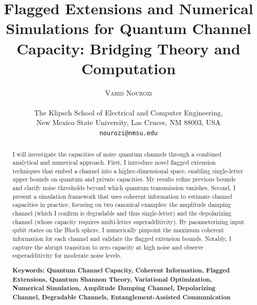 \documentclass[11pt]{article}
\theoremstyle{plain}
\theoremstyle{definition}
\numberwithin{equation}{section}
\begin{document}
\title{\textbf{Flagged Extensions and Numerical Simulations for Quantum Channel Capacity: Bridging
Theory and Computation}}


\author{
\textsc{Vahid Nourozi} \\
\vspace{-3ex}\\
\small The Klipsch School of Electrical and Computer Engineering,\\ 
\small New Mexico State University, Las Cruces, NM 88003, USA\\
\small \texttt{nourozi@nmsu.edu}
}
\date{}

\maketitle

\begin{abstract}
\noindent
I will investigate the capacities of noisy quantum channels through a combined analytical
and numerical approach. First, I introduce novel flagged extension techniques that embed
a channel into a higher-dimensional space, enabling single-letter upper bounds on
quantum and private capacities. My results refine previous bounds and clarify noise
thresholds beyond which quantum transmission vanishes. Second, I present a simulation
framework that uses coherent information to estimate channel capacities in practice,
focusing on two canonical examples: the amplitude damping channel (which I confirm is
degradable and thus single-letter) and the depolarizing channel (whose capacity requires
multi-letter superadditivity). By parameterizing input qubit states on the Bloch sphere, I
numerically pinpoint the maximum coherent information for each channel and validate the
flagged extension bounds. Notably, I capture the abrupt transition to zero capacity at high
noise and observe superadditivity for moderate noise levels.

\vspace{0.5em}\noindent
\textbf{Keywords: Quantum Channel Capacity, Coherent Information, Flagged Extensions, Quantum Shannon Theory, Variational Optimization, Numerical Simulation, Amplitude Damping Channel, Depolarizing Channel, Degradable Channels, Entanglement-Assisted Communication} 
\end{abstract}
\end{document}
